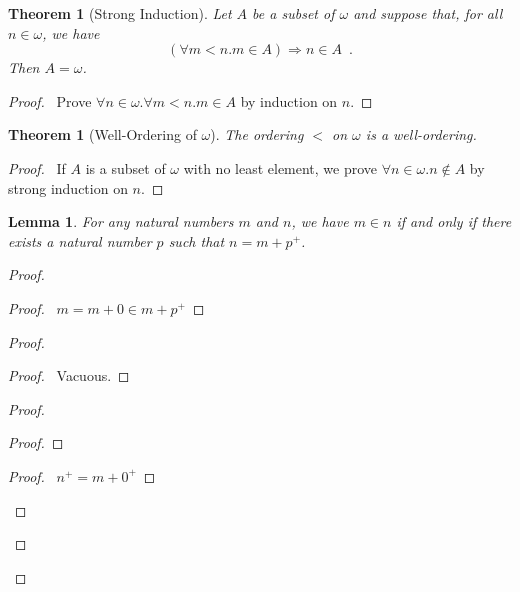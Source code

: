 \documentclass{article}
\let\qed\relax
\newtheorem{lemma}[axiom]{Lemma}
\newtheorem{theorem}[axiom]{Theorem}
\theoremstyle{definition}
\begin{document}
    \begin{theorem}[Strong Induction]
        Let $A$ be a subset of $\omega$ and suppose that, for all $n \in \omega$, we have
        \[ (\forall m < n. m \in A) \Rightarrow n \in A \enspace . \]
        Then $A = \omega$.
    \end{theorem}

    \begin{proof}
        \pf\ Prove $\forall n \in \omega. \forall m < n. m \in A$ by induction on $n$. \qed
    \end{proof}
    
    \begin{theorem}[Well-Ordering of $\omega$]
        The ordering $<$ on $\omega$ is a well-ordering.
    \end{theorem}
    
    \begin{proof}
        \pf\ If $A$ is a subset of $\omega$ with no least element, we prove $\forall n \in \omega. n \notin A$
        by strong induction on $n$. \qed
    \end{proof}

    \begin{lemma}
        \label{lemma:subtraction}
        For any natural numbers $m$ and $n$, we have $m \in n$ if and only if there exists a natural number
        $p$ such that $n = m + p^+$.
    \end{lemma}
    
    \begin{proof}
        \pf
        \begin{proof}
            \pf\ $m = m + 0 \in m + p^+$
        \end{proof}
        \begin{proof}
            \begin{proof}
                \pf\ Vacuous.
            \end{proof}
            \begin{proof}
                \begin{proof}
                \end{proof}
                \begin{proof}
                    \pf\ $n^+ = m + 0^+$
                \end{proof}
            \end{proof}
        \end{proof}
        \qed
    \end{proof}
\end{document}
